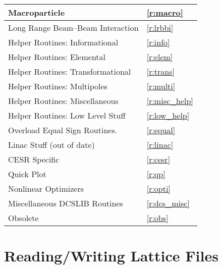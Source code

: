\begin{center}
\begin{tabular}{|l|l|}
  Macroparticle                           & \ref{r:macro}      \\ \hline
 	Long Range Beam--Beam Interaction       & \ref{r:lrbbi}      \\ \hline
 	Helper Routines: Informational          & \ref{r:info}       \\ \hline
 	Helper Routines: Elemental              & \ref{r:elem}       \\ \hline
 	Helper Routines: Transformational       & \ref{r:trans}      \\ \hline
 	Helper Routines: Multipoles             & \ref{r:multi}      \\ \hline
 	Helper Routines: Miscellaneous          & \ref{r:misc_help}  \\ \hline
 	Helper Routines: Low Level Stuff        & \ref{r:low_help}   \\ \hline
 	Overload Equal Sign Routines.           & \ref{r:equal}      \\ \hline
 	Linac Stuff (out of date)               & \ref{r:linac}      \\ \hline
 	CESR Specific                           & \ref{r:cesr}       \\ \hline
  Quick Plot                              & \ref{r:qp}         \\ \hline
  Nonlinear Optimizers                    & \ref{r:opti}       \\ \hline
  Miscellaneous DCSLIB Routines           & \ref{r:dcs_misc}   \\ \hline
 	Obsolete                                & \ref{r:obs}        \\ \hline
 	\end{tabular}
\end{center}
\toffset

\section{Reading/Writing Lattice Files} 
\label{r:read}


